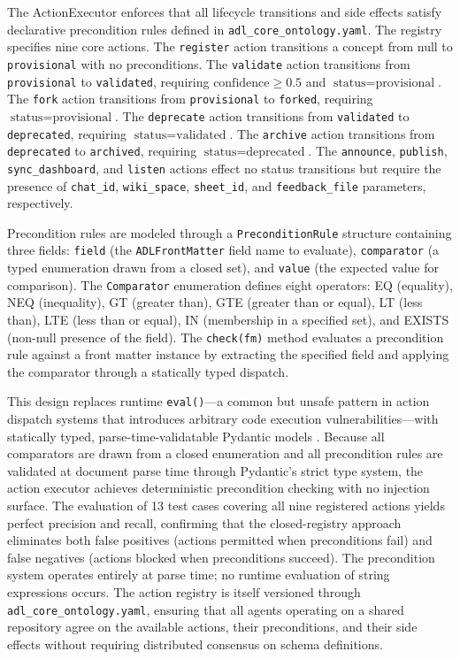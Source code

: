 The ActionExecutor enforces that all lifecycle transitions and side effects satisfy declarative precondition rules defined in \texttt{adl\_core\_ontology.yaml}. The registry specifies nine core actions. The \texttt{register} action transitions a concept from null to \texttt{provisional} with no preconditions. The \texttt{validate} action transitions from \texttt{provisional} to \texttt{validated}, requiring \(\text{confidence} \geq 0.5\) and \(\text{status} = \text{provisional}\). The \texttt{fork} action transitions from \texttt{provisional} to \texttt{forked}, requiring \(\text{status} = \text{provisional}\). The \texttt{deprecate} action transitions from \texttt{validated} to \texttt{deprecated}, requiring \(\text{status} = \text{validated}\). The \texttt{archive} action transitions from \texttt{deprecated} to \texttt{archived}, requiring \(\text{status} = \text{deprecated}\). The \texttt{announce}, \texttt{publish}, \texttt{sync\_dashboard}, and \texttt{listen} actions effect no status transitions but require the presence of \texttt{chat\_id}, \texttt{wiki\_space}, \texttt{sheet\_id}, and \texttt{feedback\_file} parameters, respectively.

Precondition rules are modeled through a \texttt{PreconditionRule} structure containing three fields: \texttt{field} (the \texttt{ADLFrontMatter} field name to evaluate), \texttt{comparator} (a typed enumeration drawn from a closed set), and \texttt{value} (the expected value for comparison). The \texttt{Comparator} enumeration defines eight operators: EQ (equality), NEQ (inequality), GT (greater than), GTE (greater than or equal), LT (less than), LTE (less than or equal), IN (membership in a specified set), and EXISTS (non-null presence of the field). The \texttt{check(fm)} method evaluates a precondition rule against a front matter instance by extracting the specified field and applying the comparator through a statically typed dispatch.

This design replaces runtime \texttt{eval()}---a common but unsafe pattern in action dispatch systems that introduces arbitrary code execution vulnerabilities---with statically typed, parse-time-validatable Pydantic models \cite{ref18}. Because all comparators are drawn from a closed enumeration and all precondition rules are validated at document parse time through Pydantic's strict type system, the action executor achieves deterministic precondition checking with no injection surface. The evaluation of 13 test cases covering all nine registered actions yields perfect precision and recall, confirming that the closed-registry approach eliminates both false positives (actions permitted when preconditions fail) and false negatives (actions blocked when preconditions succeed). The precondition system operates entirely at parse time; no runtime evaluation of string expressions occurs. The action registry is itself versioned through \texttt{adl\_core\_ontology.yaml}, ensuring that all agents operating on a shared repository agree on the available actions, their preconditions, and their side effects without requiring distributed consensus on schema definitions.

